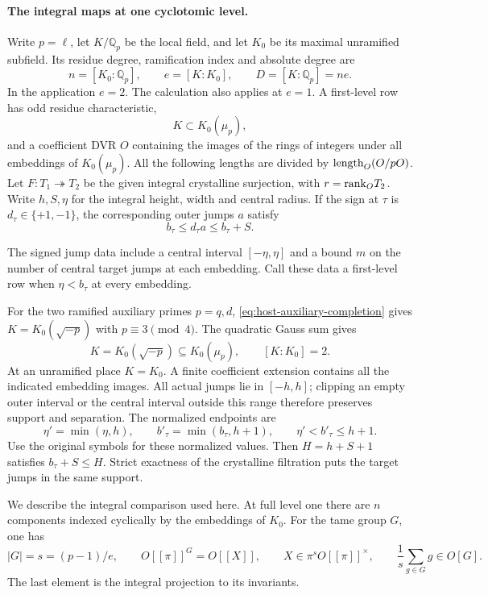 \paragraph{The integral maps at one cyclotomic level.}
\label{par:row-metric}
\hypertarget{source-row-metric}{}
\begin{paramdefinition}\label{hyp:first-level-row}
Write \(p=\ell\), let \(K/\mathbb Q_p\) be the local field, and let
\(K_0\) be its maximal unramified subfield. Its residue degree,
ramification index and absolute degree are
\[
 n=[K_0:\mathbb Q_p],\qquad e=[K:K_0],\qquad D=[K:\mathbb Q_p]=ne.
\] In the application \(e=2\).
The calculation also applies at \(e=1\).
A first-level row has odd residue characteristic,
\[
 K\subset K_0(\mu_p),
\]
and a coefficient
DVR \(O\) containing the images of the rings of integers
under all embeddings of \(K_0(\mu_p)\). All the following lengths are
divided by \({\rm length}_O(O/pO)\). Let \(F:T_1\twoheadrightarrow T_2\)
be the given integral crystalline surjection, with \(r={\rm rank}_O T_2\).
Write \(h,S,\eta\) for the integral height, width and central radius.
If the sign at \(\tau\) is \(d_\tau\in\{+1,-1\}\), the corresponding outer jumps \(a\) satisfy
\[
 b_\tau\le d_\tau a\le b_\tau+S.
\]

The signed jump data include a central interval \([-\eta,\eta]\) and a bound \(m\) on the number of central target jumps at each embedding. Call these data a first-level row when \(\eta<b_\tau\) at every embedding.
\end{paramdefinition}

For the two ramified auxiliary primes \(p=q,d\), \eqref{eq:host-auxiliary-completion} gives \(K=K_0(\sqrt{-p})\) with \(p\equiv3\pmod4\). The quadratic Gauss sum gives
\[
 K=K_0(\sqrt{-p})\subseteq K_0(\mu_p),\qquad [K:K_0]=2 .
\]
At an unramified place \(K=K_0\). A finite coefficient extension contains all the indicated embedding images. All actual jumps lie in \([-h,h]\); clipping an empty outer interval or the central interval outside this range therefore preserves support and separation. The normalized endpoints are
\[
 \eta' = \min(\eta,h),\qquad b'_\tau=\min(b_\tau,h+1),
 \qquad \eta'<b'_\tau\le h+1 .
\]
Use the original symbols for these normalized values. Then \(H=h+S+1\) satisfies \(b_\tau+S\le H\). Strict exactness of the crystalline filtration puts the target jumps in the same support.

We describe the integral comparison used here. At full level one
there are \(n\) components indexed cyclically by the embeddings of
\(K_0\). For the tame group \(G\), one has
\[
 |G|=s=(p-1)/e,\qquad O[[\pi]]^G=O[[X]],\qquad
 X\in\pi^s O[[\pi]]^\times,\qquad
 \frac{1}{s}\sum_{g\in G}g\in O[G].
\]
The last element is the integral projection to its invariants.

